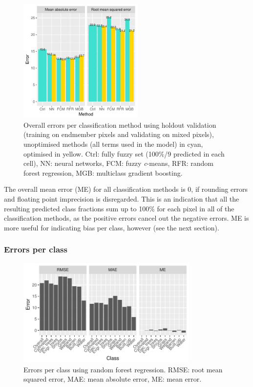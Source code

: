 \documentclass[a4paper,12pt]{scrbook}
\begin{document}
\begin{figure}
  \centering
  \includegraphics[width=0.55\textwidth]{thesis-figures/total-errors-gb}
  \caption{Overall errors per classification method using holdout validation (training on endmember pixels and validating on mixed pixels), unoptimised methods (all terms used in the model) in cyan, optimised in yellow. Ctrl: fully fuzzy set (100\%/9 predicted in each cell), NN: neural networks, FCM: fuzzy \textit{c}-means, RFR: random forest regression, MGB: multiclass gradient boosting.}
  \label{fig-total-errors-gb}
\end{figure}

The overall mean error (ME) for all classification methods is 0, if rounding errors and floating point imprecision is disregarded. This is an indication that all the resulting predicted class fractions sum up to 100\% for each pixel in all of the classification methods, as the positive errors cancel out the negative errors. ME is more useful for indicating bias per class, however (see the next section).

\subsubsection{Errors per class}

\begin{figure}
  \centering
  \includegraphics[width=0.8\textwidth]{thesis-figures/perclass-errors-rf}
  \caption{Errors per class using random forest regression. RMSE: root mean squared error, MAE: mean absolute error, ME: mean error.}
  \label{fig-perclass-errors-rf}
\end{figure}
\end{document}
